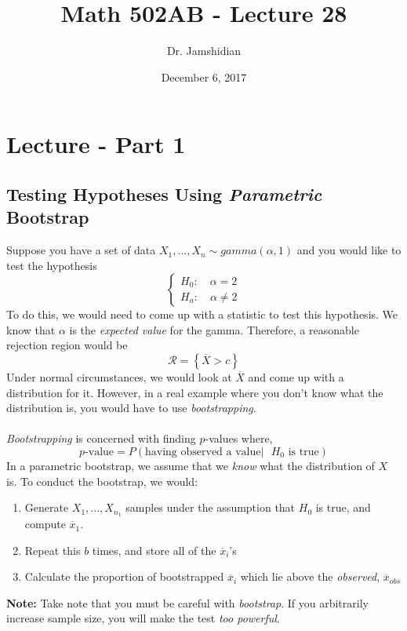 \documentclass{article}
\title{Math 502AB - Lecture 28}
\author{Dr. Jamshidian}
\date{December 6, 2017}
\begin{document}
\maketitle

\section{Lecture - Part 1}

\subsection{Testing Hypotheses Using \textit{Parametric} Bootstrap}

Suppose you have a set of data $X_1,...,X_n \sim gamma(\alpha,1)$ and you would like to test the hypothesis
\begin{equation*}
    \begin{cases}
        H_0: \quad \alpha = 2\\
        H_a: \quad \alpha \neq 2
    \end{cases}
\end{equation*}
To do this, we would need to come up with a statistic to test this hypothesis. We know that $\alpha$ is the \textit{expected value} for the gamma. Therefore, a reasonable rejection region would be
\begin{equation*}
    \mathcal{R} = \left\{\overline{X} > c \right\}
\end{equation*}
Under normal circumstances, we would look at $\overline{X}$ and come up with a distribution for it. However, in a real example where you don't know what the distribution is, you would have to use \textit{bootstrapping}.
\\~\\
\noindent \textit{Bootstrapping} is concerned with finding $p$-values where,
\begin{equation*}
    p\text{-value} = P(\text{having observed a value} | \text{ $H_0$ is true})
\end{equation*}
In a parametric bootstrap, we assume that we \textit{know} what the distribution of $X$ is. To conduct the bootstrap, we would:
\begin{enumerate}
    \item Generate $X_1,...,X_{n_1}$ samples under the assumption that $H_0$ is true, and compute $\overline{x}_1$.
    \item Repeat this $b$ times, and store all of the $\overline{x}_i$'s
    \item Calculate the proportion of bootstrapped $\overline{x}_i$ which lie above the \textit{observed}, $\overline{x}_{obs}$
\end{enumerate}
\textbf{Note:} Take note that you must be careful with \textit{bootstrap}. If you arbitrarily increase sample size, you will make the test \textit{too powerful}.
\end{document}
